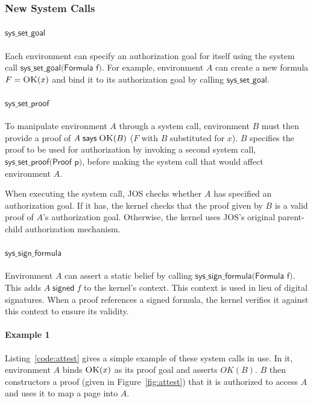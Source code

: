\documentclass[10pt]{article}
\newcommand{\sign}[2]{\ensuremath{#1\;\textsf{signed}\;#2}}
\newcommand{\says}[2]{\ensuremath{#1\;\textsf{says}\;#2}}
\newcommand{\pred}[2]{\ensuremath{\textsc{#1}(#2)}}
\begin{document}
\subsubsection{New System Calls}\label{sec:joscalls}
\paragraph{$\textsf{sys\_set\_goal}$} Each environment can specify an authorization goal for itself using the system call $\textsf{sys\_set\_goal(Formula f)}$.
For example, environment $A$ can create a new formula $F = \pred{OK}{x}$ and bind it to its authorization goal by calling $\textsf{sys\_set\_goal}$.

\paragraph{$\textsf{sys\_set\_proof}$} To manipulate environment $A$ through a system call, environment $B$ must then provide a proof of $\says{A}{\pred{OK}{B}}$ ($F$ with $B$ substituted for $x$). $B$ specifies the proof to be used for authorization by invoking a second system call, $\textsf{sys\_set\_proof(Proof p)}$, before making the system call that would affect environment $A$.

When executing the system call, JOS checks whether $A$ has specified an authorization goal. If it has, the kernel checks that the proof given by $B$ is a valid proof of $A$'s authorization goal. Otherwise, the kernel uses JOS's original parent-child authorization mechanism.

\paragraph{$\textsf{sys\_sign\_formula}$} Environment $A$ can assert a static belief by calling $\textsf{sys\_sign\_formula(Formula f)}$. This adds $\sign{A}{f}$ to the kernel's context.
This context is used in lieu of digital signatures. When a proof references a signed formula, the kernel verifies it against this context to ensure its validity.

\paragraph{Example 1} Listing~\ref{code:attest} gives a simple example of these system calls in use. In it, environment $A$ binds $\pred{OK}{x}$ as its proof goal and asserts $OK(B)$. $B$ then constructors a proof (given in Figure~\ref{fig:attest}) that it is authorized to access $A$ and uses it to map a page into $A$.
\end{document}
